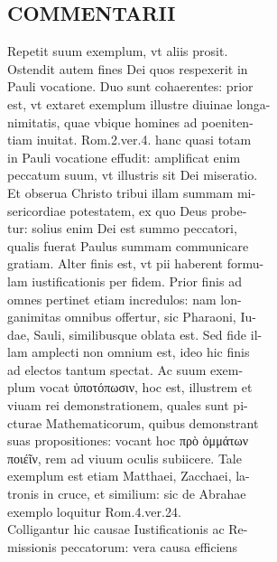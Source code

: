 \documentclass{article}
\begin{document}
\begin{pages}
\section*{COMMENTARII \\
                }Repetit suum exemplum, vt aliis prosit. \\
                Ostendit autem fines Dei quos respexerit in \\
                Pauli vocatione. Duo sunt cohaerentes: prior \\
                est, vt extaret exemplum illustre diuinae longa- \\
                nimitatis, quae vbique homines ad poeniten- \\
                tiam inuitat. Rom.2.ver.4. hanc quasi totam \\
                in Pauli vocatione effudit: amplificat enim \\
                peccatum suum, vt illustris sit Dei miseratio. \\
                Et obserua Christo tribui illam summam mi- \\
                sericordiae potestatem, ex quo Deus probe- \\
                tur: solius enim Dei est summo peccatori, \\
                qualis fuerat Paulus summam communicare \\
                gratiam. Alter finis est, vt pii haberent formu- \\
                lam iustificationis per fidem. Prior finis ad \\
                omnes pertinet etiam incredulos: nam lon- \\
                ganimitas omnibus offertur, sic Pharaoni, Iu- \\
                dae, Sauli, similibusque oblata est. Sed fide il- \\
                lam amplecti non omnium est, ideo hic finis \\
                ad electos tantum spectat. Ac suum exem- \\
                plum vocat ὐποτόπωσιν, hoc est, illustrem et \\
                viuam rei demonstrationem, quales sunt pi- \\
                cturae Mathematicorum, quibus demonstrant \\
                suas propositiones: vocant hoc πρὸ ὀμμάτων \\
                ποιέῖν, rem ad viuum oculis subiicere. Tale \\
                exemplum est etiam Matthaei, Zacchaei, la- \\
                tronis in cruce, et similium: sic de Abrahae \\
                exemplo loquitur Rom.4.ver.24. \\
                Colligantur hic causae Iustificationis ac Re- \\
                missionis peccatorum: vera causa efficiens \\
                

\end{pages}
\end{document}
